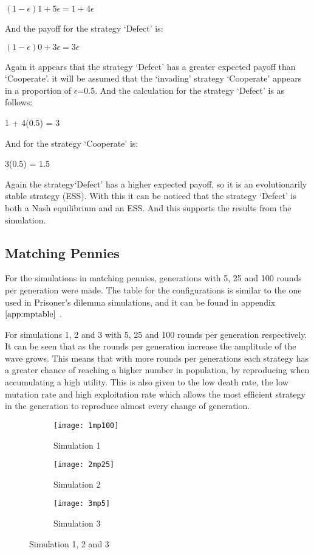 \begin{center}
$(1-{\epsilon})1 + 5{\epsilon} = 1 + 4{\epsilon}$
\end{center}
And the payoff for the strategy `Defect' is:
\begin{center}
$(1-{\epsilon})0 + 3{\epsilon} =  3{\epsilon}$
\end{center}
Again it appears that the strategy `Defect' has a greater expected payoff than `Cooperate'. it will be assumed that the `invading' strategy `Cooperate' appears in a proportion of $\epsilon$=0.5. And the calculation for the strategy `Defect' is as follows:
\begin{center}
1 +  4(0.5) = 3
\end{center}
And for the strategy `Cooperate' is:
\begin{center}
 3(0.5) = 1.5
\end{center}
Again the strategy`Defect' has a higher expected payoff, so it is an evolutionarily stable strategy (ESS).
With this it can be noticed that the strategy `Defect' is both a Nash equilibrium and an ESS. And this supports the results from the simulation.


\subsection{Matching Pennies}

For the simulations in matching pennies, generations with 5, 25 and 100 rounds per generation were made.  The table for the configurations is similar to the one used in Prisoner's dilemma simulations, and it can be found in appendix $\ref{app:mptable}$ .

For simulations 1, 2 and 3 with 5, 25 and 100 rounds per generation respectively. It can be seen that as the rounds per generation increase the amplitude of the wave grows. This means that with more rounds per generations each strategy has a greater chance of reaching a higher number in population, by reproducing when accumulating a high utility. This is also given to the low death rate, the low mutation rate and high exploitation rate which allows the most efficient strategy in the generation to reproduce almost every change of generation.

\begin{figure}[H]       
    \centering
    \begin{subfigure}[b]{0.3\textwidth}
	\centering
	{\texttt{[image: 1mp100]}}   
    	\caption{Simulation 1}
	\label{fig:mpsim1}
    \end{subfigure}
    \hfill
    \begin{subfigure}[b]{0.3\textwidth}
	\centering
	{\texttt{[image: 2mp25]}}   
    	\caption{Simulation 2}
	\label{fig:mpsim2}
    \end{subfigure}
    \hfill
    \begin{subfigure}[b]{0.3\textwidth}
	\centering
	{\texttt{[image: 3mp5]}}   
    	\caption{Simulation 3}
	\label{fig:mpsim3}
    \end{subfigure}
    \caption{Simulation 1, 2 and 3}
    \label{firstthreesimulations}
\end{figure}

